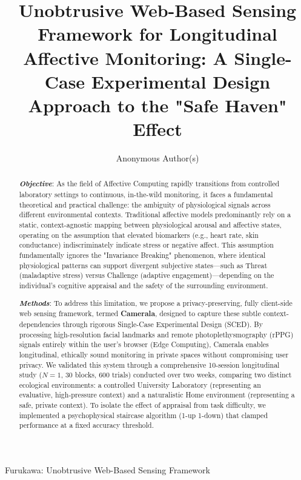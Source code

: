 \documentclass[journal]{IEEEtran}
\begin{document}
\title{Unobtrusive Web-Based Sensing Framework for Longitudinal Affective Monitoring: A Single-Case Experimental Design Approach to the "Safe Haven" Effect}

\author{Anonymous Author(s)}

%
{Furukawa: Unobtrusive Web-Based Sensing Framework}

\maketitle

\begin{abstract}
\textbf{\textit{Objective}}: As the field of Affective Computing rapidly transitions from controlled laboratory settings 
to continuous, in-the-wild monitoring, it faces a fundamental theoretical and practical challenge: 
the ambiguity of physiological signals across different environmental contexts. 
Traditional affective models predominantly rely on a static, context-agnostic mapping between physiological arousal and affective states, 
operating on the assumption that elevated biomarkers (e.g., heart rate, skin conductance) indiscriminately indicate stress or negative affect. 
This assumption fundamentally ignores the "Invariance Breaking" phenomenon, where identical physiological patterns can support 
divergent subjective states—such as Threat (maladaptive stress) versus Challenge (adaptive engagement)—depending on the 
individual's cognitive appraisal and the safety of the surrounding environment.

\textbf{\textit{Methods}}: To address this limitation, we propose a privacy-preserving, fully client-side web sensing framework, 
termed \textbf{Camerala}, designed to capture these subtle context-dependencies through rigorous Single-Case Experimental Design (SCED). 
By processing high-resolution facial landmarks and remote photoplethysmography (rPPG) signals entirely within the user's browser (Edge Computing), 
Camerala enables longitudinal, ethically sound monitoring in private spaces without compromising user privacy. 
We validated this system through a comprehensive 10-session longitudinal study ($N=1$, 30 blocks, 600 trials) conducted over two weeks, 
comparing two distinct ecological environments: a controlled University Laboratory (representing an evaluative, high-pressure context) 
and a naturalistic Home environment (representing a safe, private context). 
To isolate the effect of appraisal from task difficulty, we implemented a psychophysical staircase algorithm (1-up 1-down) 
that clamped performance at a fixed accuracy threshold.


\end{abstract}
\end{document}
